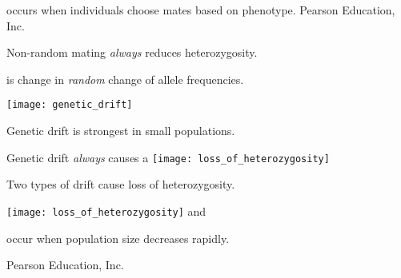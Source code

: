 \documentclass[t]{beamer}
\begin{document}
%
{
\begin{frame}[b]{ occurs when individuals choose mates based on phenotype.}
\hfill \tiny \textcopyright Pearson Education, Inc.
\end{frame}
}
%
{
\begin{frame}[b]{Non-random mating \emph{always} reduces heterozygosity.}
\end{frame}
}
%
\begin{frame}[t]{ is change in \emph{random} change of allele frequencies.}
	\vspace*{-\baselineskip}
	\begin{center}
		\texttt{[image: genetic\_drift]}
	\end{center}

	\vspace*{-\baselineskip}
	
	\hangpara Genetic drift is strongest in small populations.

\end{frame}
{
\begin{frame}{Genetic drift \emph{always} causes a }
	\texttt{[image: loss\_of\_heterozygosity]}
\end{frame}
}
%
{
\begin{frame}{Two types of drift cause  loss of heterozygosity.}

	\begin{multicols}{2}
		\texttt{[image: loss\_of\_heterozygosity]}
	\columnbreak
		\hangpara {} and\\ 
	\end{multicols}
	
\end{frame}
}
%
{
\begin{frame}[b]{ occur when population size decreases rapidly.}

\hfill \tiny \textcopyright Pearson Education, Inc.
\end{frame}
}
%
\end{document}
